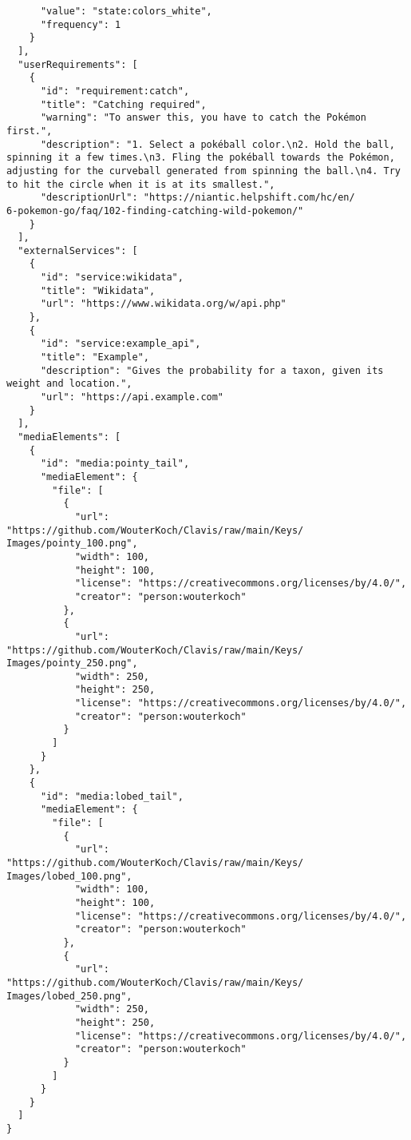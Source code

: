 \documentclass[10pt,letterpaper]{article}
\begin{document}
\begin{verbatim}
      "value": "state:colors_white",
      "frequency": 1
    }
  ],
  "userRequirements": [
    {
      "id": "requirement:catch",
      "title": "Catching required",
      "warning": "To answer this, you have to catch the Pokémon
first.",
      "description": "1. Select a pokéball color.\n2. Hold the ball,
spinning it a few times.\n3. Fling the pokéball towards the Pokémon,
adjusting for the curveball generated from spinning the ball.\n4. Try
to hit the circle when it is at its smallest.",
      "descriptionUrl": "https://niantic.helpshift.com/hc/en/
6-pokemon-go/faq/102-finding-catching-wild-pokemon/"
    }
  ],
  "externalServices": [
    {
      "id": "service:wikidata",
      "title": "Wikidata",
      "url": "https://www.wikidata.org/w/api.php"
    },
    {
      "id": "service:example_api",
      "title": "Example",
      "description": "Gives the probability for a taxon, given its
weight and location.",
      "url": "https://api.example.com"
    }
  ],
  "mediaElements": [
    {
      "id": "media:pointy_tail",
      "mediaElement": {
        "file": [
          {
            "url": "https://github.com/WouterKoch/Clavis/raw/main/Keys/
Images/pointy_100.png",
            "width": 100,
            "height": 100,
            "license": "https://creativecommons.org/licenses/by/4.0/",
            "creator": "person:wouterkoch"
          },
          {
            "url": "https://github.com/WouterKoch/Clavis/raw/main/Keys/
Images/pointy_250.png",
            "width": 250,
            "height": 250,
            "license": "https://creativecommons.org/licenses/by/4.0/",
            "creator": "person:wouterkoch"
          }
        ]
      }
    },
    {
      "id": "media:lobed_tail",
      "mediaElement": {
        "file": [
          {
            "url": "https://github.com/WouterKoch/Clavis/raw/main/Keys/
Images/lobed_100.png",
            "width": 100,
            "height": 100,
            "license": "https://creativecommons.org/licenses/by/4.0/",
            "creator": "person:wouterkoch"
          },
          {
            "url": "https://github.com/WouterKoch/Clavis/raw/main/Keys/
Images/lobed_250.png",
            "width": 250,
            "height": 250,
            "license": "https://creativecommons.org/licenses/by/4.0/",
            "creator": "person:wouterkoch"
          }
        ]
      }
    }
  ]
}
  

\end{verbatim}
\nolinenumbers
\end{document}
